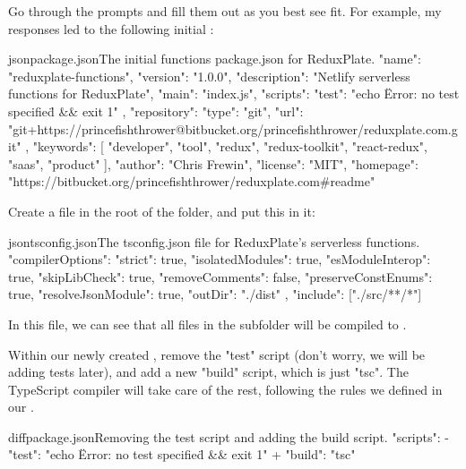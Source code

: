 \documentclass[paper=6in:9in,pagesize=pdftex,headinclude=on,footinclude=on,12pt,twoside]{scrbook}
\begin{document}
Go through the prompts and fill them out as you best see fit. For example, my responses led to the following initial :

\begin{codeInput}{json}{package.json}{The initial functions package.json for ReduxPlate.}
{
  "name": "reduxplate-functions",
  "version": "1.0.0",
  "description": "Netlify serverless functions for ReduxPlate",
  "main": "index.js",
  "scripts": {
    "test": "echo \"Error: no test specified\" && exit 1"
  },
  "repository": {
    "type": "git",
    "url": "git+https://princefishthrower@bitbucket.org/princefishthrower/reduxplate.com.git"
  },
  "keywords": [
    "developer",
    "tool",
    "redux",
    "redux-toolkit",
    "react-redux",
    "saas",
    "product"
  ],
  "author": "Chris Frewin",
  "license": "MIT",
  "homepage": "https://bitbucket.org/princefishthrower/reduxplate.com#readme"
}
\end{codeInput}


Create a  file in the root of the  folder, and put this in it:

\begin{codeInput}{json}{tsconfig.json}{The tsconfig.json file for ReduxPlate's serverless functions.}
{
  "compilerOptions": {
    "strict": true,
    "isolatedModules": true,
    "esModuleInterop": true,
    "skipLibCheck": true,
    "removeComments": false,
    "preserveConstEnums": true,
    "resolveJsonModule": true,
    "outDir": "./dist"
  },
  "include": ["./src/**/*"]
}
\end{codeInput}

In this  file, we can see that all files in the subfolder  will be compiled to .


Within our newly created , remove the "test" script (don't worry, we will be adding tests later), and add a new "build" script, which is just "tsc". The TypeScript compiler will take care of the rest, following the rules we defined in our .

\begin{codeInput}{diff}{package.json}{Removing the test script and adding the build script.}
"scripts": {
-  "test": "echo \"Error: no test specified\" && exit 1"
+  "build": "tsc"
}
\end{codeInput}
\end{document}
